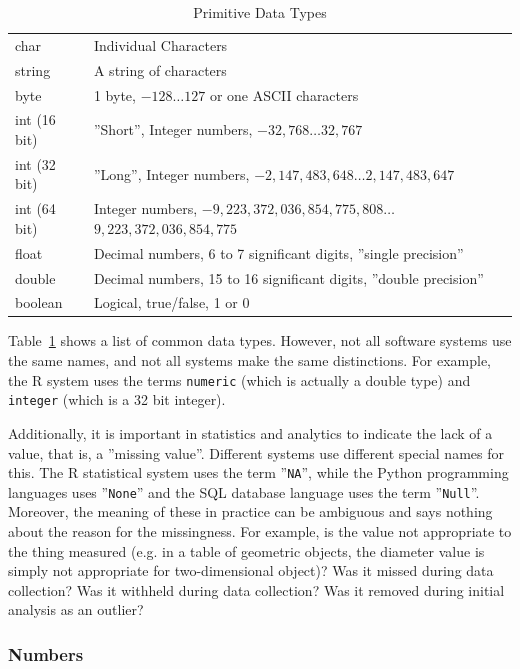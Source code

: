 \begin{table}
\renewcommand{\arraystretch}{1.25}

\begin{tabularx}{\textwidth}{l|X} \hline
char 			& Individual Characters\\
string			& A string of characters\\
byte			& 1 byte, $-128 \ldots 127$ or one ASCII characters \\
int (16 bit)	& ''Short'', Integer numbers, $-32,768 \ldots 32,767$ \\ 
int (32 bit)	& ''Long'', Integer numbers, $-2,147,483,648 \ldots 2,147,483,647$ \\
int (64 bit)	& Integer numbers, $-9,223,372,036,854,775,808 \ldots$ $9,223,372,036,854,775$ \\
float			& Decimal numbers, 6 to 7 significant digits, ''single precision'' \\
double			& Decimal numbers, 15 to 16 significant digits, ''double precision'' \\
boolean			& Logical, true/false, 1 or 0 \\ \hline
\end{tabularx} 
\caption{Primitive Data Types}
\label{tab:primitive}
\end{table}

Table~\ref{tab:primitive} shows a list of common data types. However, not all software systems use the same names, and not all systems make the same distinctions. For example, the R system uses the terms \texttt{numeric} (which is actually a double type) and \texttt{integer} (which is a 32 bit integer).

Additionally, it is important in statistics and analytics to indicate the lack of a value, that is, a ''missing value''. Different systems use different special names for this. The R statistical system uses the term ''\texttt{NA}'', while the Python programming languages uses ''\texttt{None}'' and the SQL database language uses the term ''\texttt{Null}''. Moreover, the meaning of these in practice can be ambiguous and says nothing about the reason for the missingness. For example, is the value not appropriate to the thing measured (e.g. in a table of geometric objects, the diameter value is simply not appropriate for two-dimensional object)? Was it missed during data collection? Was it withheld during data collection? Was it removed during initial analysis as an outlier?

\subsubsection*{Numbers} 

